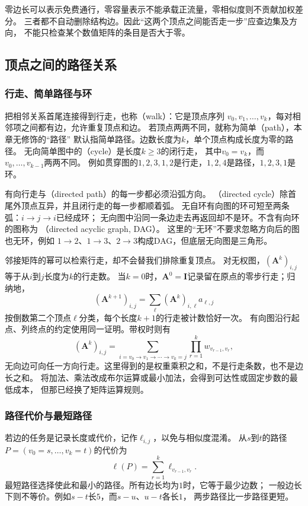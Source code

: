 零边长可以表示免费通行，零容量表示不能承载正流量，零相似度则不贡献加权差分。
三者都不自动删除结构边。因此“这两个顶点之间能否走一步”应查边集及方向，
不能只检查某个数值矩阵的条目是否大于零。

\subsection{顶点之间的路径关系}

\subsubsection{行走、简单路径与环}

把相邻关系首尾连接得到行走，也称（walk）：它是顶点序列
\(v_0,v_1,\ldots,v_k\)，每对相邻项之间都有边，允许重复顶点和边。
若顶点两两不同，就称为简单（path），本章无修饰的“路径”
默认指简单路径。边数长度为\(k\)，单个顶点构成长度为零的路径。
无向简单图中的（cycle）是长度\(k\geq3\)的闭行走，
其中\(v_0=v_k\)，而\(v_0,\ldots,v_{k-1}\)两两不同。
例如贯穿图的\(1,2,3,1,2\)是行走，\(1,2,4\)是路径，\(1,2,3,1\)是环。

有向行走与（directed path）的每一步都必须沿弧方向。
（directed cycle）除首尾外顶点互异，并且闭行走的每一步都顺着弧。
无自环有向图的环可短至两条弧：\(i\to j\to i\)已经成环；
无向图中沿同一条边走去再返回却不是环。不含有向环的图称为
（directed acyclic graph, DAG）。
这里的“无环”不要求忽略方向后的图也无环，例如
\(1\to2\)、\(1\to3\)、\(2\to3\)构成DAG，但底层无向图是三角形。

邻接矩阵的幂可以检索行走，却不会替我们排除重复顶点。
对无权图，\((\bm A^k)_{i,j}\)等于从\(i\)到\(j\)长度为\(k\)的行走数。
当\(k=0\)时，\(\bm A^0=\bm I\)记录留在原点的零步行走；归纳地，
\[
  (\bm A^{k+1})_{i,j}=\sum_\ell(\bm A^k)_{i,\ell}a_{\ell,j}
\]
按倒数第二个顶点\(\ell\)分类，每个长度\(k+1\)的行走被计数恰好一次。
有向图沿行起点、列终点的约定使用同一证明。带权时则有
\[
  (\bm A^k)_{i,j}
  =\sum_{i=v_0\to v_1\to\cdots\to v_k=j}
    \prod_{r=1}^{k}w_{v_{r-1},v_r},
\]
无向边可向任一方向行走。这里得到的是权重乘积之和，不是行走条数，也不是边长之和。
将加法、乘法改成布尔运算或最小加法，会得到可达性或固定步数的最低成本，
但那已经换了矩阵运算规则。

\subsubsection{路径代价与最短路径}

若边的任务是记录长度或代价，记作\(\ell_{i,j}\)，以免与相似度混淆。
从\(s\)到\(t\)的路径\(P=(v_0=s,\ldots,v_k=t)\)的代价为
\[
  \ell(P)=\sum_{r=1}^{k}\ell_{v_{r-1},v_r}.
\]
最短路径选择使此和最小的路径。所有边长均为\(1\)时，它等于最少边数；
一般边长下则不等价。例如\(s-t\)长\(5\)，而\(s-u\)、\(u-t\)各长\(1\)，
两步路径比一步路径更短。


